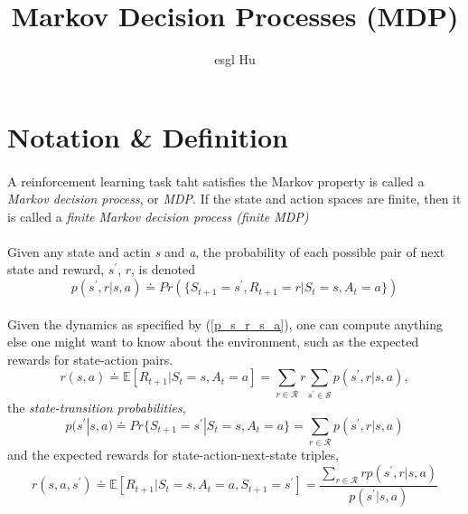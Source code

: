 \documentclass[12pt,a4paper]{article}
\begin{document}
\title{Markov Decision Processes (MDP)}
\author{esgl Hu}
\maketitle
\fi
\section{Notation \& Definition}
\paragraph{} A reinforcement learning task taht satisfies the Markov property 
is called a \textit{Markov decision process}, or \textit{MDP}. If the state and action spaces are finite, then it is called a \textit{finite Markov decision process (finite MDP)}
\paragraph{}Given any state and actin \textit{s} and \textit{a}, the probability of each possible pair of next state and reward, $s^{'}$, $r$, is denoted
\begin{equation}\label{p_s_r_s_a}
p(s^{'},r|s,a) \doteq Pr(\{S_{t+1}=s^{'},R_{t+1}=r|S_{t}=s, A_{t}=a\})
\end{equation}
\paragraph{}Given the dynamics as specified by (\ref{p_s_r_s_a}), one can compute anything else one might want to know about the environment, such as the expected rewards for state-action pairs.
\begin{equation}\label{r_s_a}
r(s,a) \doteq \mathbb{E}[R_{t+1}|S_{t}=s,A_{t}=a] = \sum_{r \in \mathcal{R}}r\sum_{s^{'} \in \mathcal{S}}p(s^{'},r|s,a),
\end{equation}
the \textit{state-transition probabilities},
\begin{equation}\label{p_s_s_a}
p(s^{'}|s,a) \doteq Pr\{S_{t+1}=s^{'}|S_{t}=s,A_{t}=a\}=\sum_{r \in \mathcal{R}}p(s^{'},r|s,a)
\end{equation}
and the expected rewards for state-action-next-state triples,
\begin{equation}\label{r_s_a_s}
r(s,a,s^{'}) \doteq \mathbb{E}[R_{t+1}|S_{t}=s,A_{t}=a,S_{t+1}=s^{'}] = \frac{\sum_{r \in \mathcal{R}}rp(s^{'},r|s,a)}{p(s^{'}|s,a)}
\end{equation}
\ifx\allfiles\undefined
\end{document}
